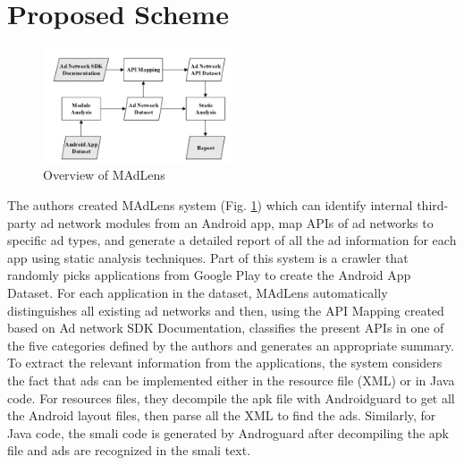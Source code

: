 \documentclass[conference]{IEEEtran}
\begin{document}
\section{Proposed Scheme}
\label{SectionFour}
\begin{figure}[htbp]
	\includegraphics[width=0.5\textwidth,height=0.5\textheight,keepaspectratio]{system.png}
	\caption{Overview of MAdLens}
	\label{fig:system}
\end{figure}
The authors created MAdLens system (Fig. \ref{fig:system}) which can identify internal third-party ad network modules from an Android app, map APIs of ad networks to specific ad types, and generate a detailed report of all the ad information for each app using static analysis techniques. Part of this system is a crawler that randomly picks applications from Google Play to create the Android App Dataset. For each application in the dataset, MAdLens automatically distinguishes all existing ad networks and then, using the API Mapping created based on Ad network SDK Documentation, classifies the present APIs in one of the five categories defined by the authors and generates an appropriate summary. To extract the relevant information from the applications, the system considers the fact that ads can be implemented either in the resource file (XML) or in Java code. For resources files, they decompile the apk file with Androidguard to get all the Android layout files, then parse all the XML to find the ads. Similarly, for Java code, the smali code is generated by Androguard after decompiling the apk file and ads are recognized in the smali text.
\end{document}
